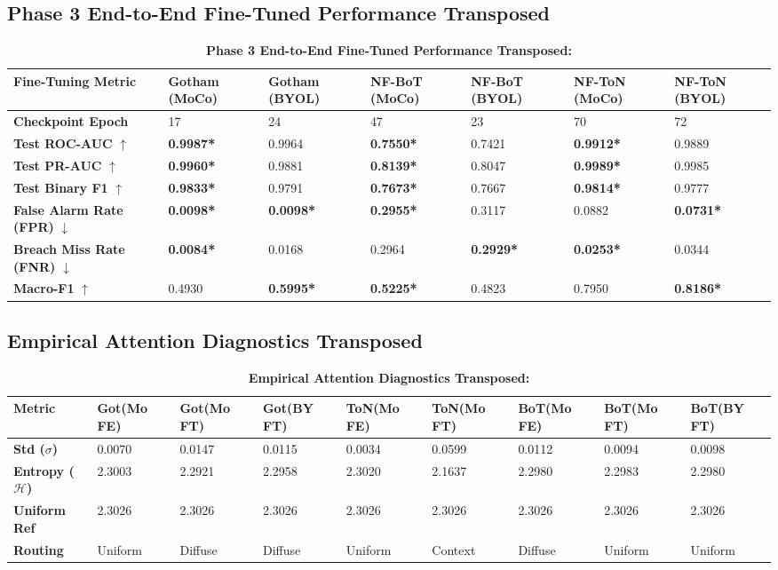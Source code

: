 \documentclass[10pt,a4paper]{article}
\newcommand{\best}[1]{\textbf{\textcolor{bestgreen}{#1*}}}
\begin{document}
\subsection{Phase 3 End-to-End Fine-Tuned Performance Transposed}
\begin{table}[htbp]
\centering
\small
\caption{\textbf{Phase 3 End-to-End Fine-Tuned Performance Transposed:}}
\begin{tabularx}{\textwidth}{lXXXXXX}
\toprule
\textbf{Fine-Tuning Metric} & \textbf{Gotham (MoCo)} & \textbf{Gotham (BYOL)} & \textbf{NF-BoT (MoCo)} & \textbf{NF-BoT (BYOL)} & \textbf{NF-ToN (MoCo)} & \textbf{NF-ToN (BYOL)} \\
\midrule
\textbf{Checkpoint Epoch} & 17 & 24 & 47 & 23 & 70 & 72 \\
\textbf{Test ROC-AUC} $\uparrow$ & \best{0.9987} & 0.9964 & \best{0.7550} & 0.7421 & \best{0.9912} & 0.9889 \\
\textbf{Test PR-AUC} $\uparrow$ & \best{0.9960} & 0.9881 & \best{0.8139} & 0.8047 & \best{0.9989} & 0.9985 \\
\textbf{Test Binary F1} $\uparrow$ & \best{0.9833} & 0.9791 & \best{0.7673} & 0.7667 & \best{0.9814} & 0.9777 \\
\textbf{False Alarm Rate (FPR)} $\downarrow$ & \best{0.0098} & \best{0.0098} & \best{0.2955} & 0.3117 & 0.0882 & \best{0.0731} \\
\textbf{Breach Miss Rate (FNR)} $\downarrow$ & \best{0.0084} & 0.0168 & 0.2964 & \best{0.2929} & \best{0.0253} & 0.0344 \\
\textbf{Macro-F1} $\uparrow$ & 0.4930 & \best{0.5995} & \best{0.5225} & 0.4823 & 0.7950 & \best{0.8186} \\
\bottomrule
\end{tabularx}
\label{tab:ft_transposed2}
\end{table}

\subsection{Empirical Attention Diagnostics Transposed}
\begin{table}[htbp]
\centering
\small
\caption{\textbf{Empirical Attention Diagnostics Transposed:}}
\begin{tabularx}{\textwidth}{lXXXXXXXX}
\toprule
\textbf{Metric} & \textbf{Got(Mo FE)} & \textbf{Got(Mo FT)} & \textbf{Got(BY FT)} & \textbf{ToN(Mo FE)} & \textbf{ToN(Mo FT)} & \textbf{BoT(Mo FE)} & \textbf{BoT(Mo FT)} & \textbf{BoT(BY FT)} \\
\midrule
\textbf{Std ($\sigma$)} & 0.0070 & 0.0147 & 0.0115 & 0.0034 & 0.0599 & 0.0112 & 0.0094 & 0.0098 \\
\textbf{Entropy ($\mathcal{H}$)} & 2.3003 & 2.2921 & 2.2958 & 2.3020 & 2.1637 & 2.2980 & 2.2983 & 2.2980 \\
\textbf{Uniform Ref} & 2.3026 & 2.3026 & 2.3026 & 2.3026 & 2.3026 & 2.3026 & 2.3026 & 2.3026 \\
\textbf{Routing} & Uniform & Diffuse & Diffuse & Uniform & Context & Diffuse & Uniform & Uniform \\
\bottomrule
\end{tabularx}
\label{tab:att_transposed2}
\end{table}
\end{document}
